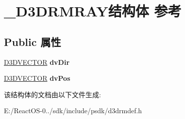 \hypertarget{struct___d3_d_r_m_r_a_y}{}\section{\+\_\+\+D3\+D\+R\+M\+R\+A\+Y结构体 参考}
\label{struct___d3_d_r_m_r_a_y}
\subsection*{Public 属性}
\begin{DoxyCompactItemize}
\item 
\mbox{\label{struct___d3_d_r_m_r_a_y_a4c5b9fbda9f1e1be33c3b313a611a882}} 
\hyperlink{struct___d3_d_v_e_c_t_o_r}{D3\+D\+V\+E\+C\+T\+OR} {\bfseries dv\+Dir}
\item 
\mbox{\label{struct___d3_d_r_m_r_a_y_a301ec88d23c5384f7bb0337bd36a0431}} 
\hyperlink{struct___d3_d_v_e_c_t_o_r}{D3\+D\+V\+E\+C\+T\+OR} {\bfseries dv\+Pos}
\end{DoxyCompactItemize}


该结构体的文档由以下文件生成\+:\begin{DoxyCompactItemize}
\item 
E\+:/\+React\+O\+S-\/0../sdk/include/psdk/d3drmdef.\+h\end{DoxyCompactItemize}
